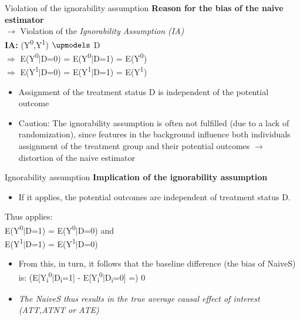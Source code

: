 \documentclass{beamer}\usepackage[]{graphicx}\usepackage[]{color}
\begin{document}
\begin{frame}{Violation of the ignorability assumption}
\textbf{Reason for the bias of the naive estimator} 
\\
$\rightarrow$ Violation of the \textit{Ignorability Assumption (IA)} 
\\[1em]
\textbf{IA:} (Y\textsuperscript{0},Y\textsuperscript{1}) $\upmodels$ D 
\\
$\Rightarrow$ E(Y\textsuperscript{0}$\vert$D=0) = E(Y\textsuperscript{0}$\vert$D=1) = E(Y\textsuperscript{0}) 
\\
$\Rightarrow$ E(Y\textsuperscript{1}$\vert$D=0) = E(Y\textsuperscript{1}$\vert$D=1) = E(Y\textsuperscript{1})

\begin{itemize}
\item Assignment of the treatment status D is independent of the potential outcome
\item Caution: The ignorability assumption is often not fulfilled (due to a lack of randomization), since features in the background influence both individuals assignment of the treatment group and their potential outcomes $\rightarrow$ distortion of the naive estimator
\end{itemize}
\end{frame}


\begin{frame}{Ignorability assumption}
\textbf{Implication of the ignorability assumption}
\\[1em]
\begin{itemize}
  \item If it applies, the potential outcomes are independent of treatment status D.\\
\end{itemize}
Thus applies:
\\
E(Y\textsuperscript{0}$\vert$D=1) = E(Y\textsuperscript{0}$\vert$D=0) and 
\\
E(Y\textsuperscript{1}$\vert$D=1) = E(Y\textsuperscript{1}$\vert$D=0)
\\[1em]
\begin{itemize}
\item From this, in turn, it follows that the baseline difference (the bias of NaiveS) is: (E[Y\textsubscript{i}\textsuperscript{0}$\vert$D\textsubscript{i}=1] - E[Y\textsubscript{i}\textsuperscript{0}$\vert$D\textsubscript{i}=0] =) 0 
\item \textit{The NaiveS thus results in the true average causal effect of interest (ATT,ATNT or ATE)}
\end{itemize}

\end{frame}
\end{document}
